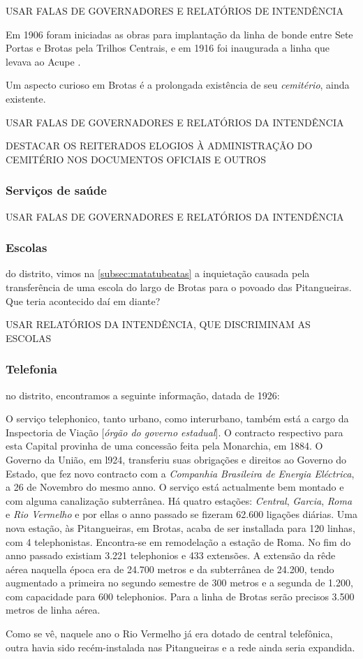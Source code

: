 USAR FALAS DE GOVERNADORES E RELATÓRIOS DE INTENDÊNCIA


Em 1906 foram iniciadas as obras para implantação da linha de bonde entre Sete Portas e Brotas pela Trilhos Centrais, e em 1916 foi inaugurada a linha que levava ao Acupe \cite[p.~299]{VASCONCELOS2002}.


Um aspecto curioso em Brotas é a prolongada existência de seu \textit{cemitério}, ainda existente.

USAR FALAS DE GOVERNADORES E RELATÓRIOS DA INTENDÊNCIA

DESTACAR OS REITERADOS ELOGIOS À ADMINISTRAÇÃO DO CEMITÉRIO NOS DOCUMENTOS OFICIAIS E OUTROS

\subsubsection{Serviços de saúde}

USAR FALAS DE GOVERNADORES E RELATÓRIOS DA INTENDÊNCIA

\subsubsection{Escolas} 

do distrito, vimos na \autoref{subsec:matatubeatas} a inquietação causada pela transferência de uma escola do largo de Brotas para o povoado das Pitangueiras. Que teria acontecido daí em diante?



USAR RELATÓRIOS DA INTENDÊNCIA, QUE DISCRIMINAM AS ESCOLAS

\subsubsection{Telefonia} 

no distrito, encontramos a seguinte informação, datada de 1926:

\begin{citacao}
O serviço telephonico, tanto urbano, como interurbano, também está a cargo da Inspectoria de Viação [\textit{órgão do governo estadual}].
O contracto respectivo para esta Capital provinha de uma concessão feita pela Monarchia, em 1884.
O Governo da União, em l924, transferiu suas obrigações e direitos ao Governo do Estado, que fez novo contracto com a \textit{Companhia Brasileira de Energia Eléctrica}, a 26 de Novembro do mesmo anno.
O serviço está actualmente bem montado e com alguma canalização subterrânea.
Há quatro estações: \textit{Central}, \textit{Garcia}, \textit{Roma} e \textit{Rio Vermelho} e por ellas o anno passado se fizeram 62.600 ligações diárias.
Uma nova estação, às Pitangueiras, em Brotas, acaba de ser installada para 120 linhas, com 4 telephonistas.
Encontra-se em remodelação a estação de Roma.
No fim do anno passado existiam 3.221 telephonios e 433 extensões.
A extensão da rêde aérea naquella época era de 24.700 metros e da subterrânea de 24.200, tendo augmentado a primeira no segundo semestre de 300 metros e a segunda
de 1.200, com capacidade para 600 telephonios.
Para a linha de Brotas serão precisos 3.500 metros de linha aérea. \cite[pp.~266-267]{bahia_rpe_1926}
\end{citacao}

Como se vê, naquele ano o Rio Vermelho já era dotado de central telefônica, outra havia sido recém-instalada nas Pitangueiras e a rede ainda seria expandida.
